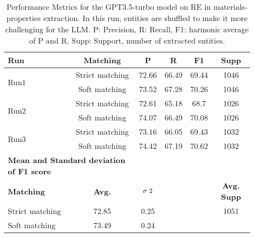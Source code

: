 \begin{table}[htbp]
    \small
    \centering
    \caption{Performance Metrics for the GPT3.5-turbo model on RE in materials-properties extraction. In this run, entities are shuffled to make it more challenging for the LLM. P: Precision, R: Recall, F1: harmonic average of P and R, Supp: Support, number of extracted entities.}
    \begin{tabular}{lccccc}
        \toprule
        \textbf{Run} & \textbf{Matching} & \textbf{P} & \textbf{R} & \textbf{F1} & \textbf{Supp} \\
        \midrule
        \multirow{2}{*}{Run1} & Strict matching & 72.66 & 66.49 & 69.44 & 1046 \\
        & Soft matching & 73.52 & 67.28 & 70.26 & 1046 \\
        \midrule
        \multirow{2}{*}{Run2} & Strict matching & 72.61 & 65.18 & 68.7 & 1026 \\
        & Soft matching & 74.07 & 66.49 & 70.08 & 1026 \\
        \midrule
        \multirow{2}{*}{Run3} & Strict matching & 73.16 & 66.05 & 69.43 & 1032 \\
        & Soft matching & 74.42 & 67.19 & 70.62 & 1032 \\
        \midrule
        \multicolumn{2}{l}{\textbf{Mean and Standard deviation of F1 score}} & & & & \\
        \midrule
        \textbf{Matching} & \textbf{Avg.} & $\sigma\textsuperscript{2}$ & & & \textbf{Avg. Supp}\\
        Strict matching & 72.85 & 0.25 & & & 1051 \\
        Soft matching   & 73.49 & 0.24 & & \\
        \bottomrule
    \end{tabular}
\end{table}

